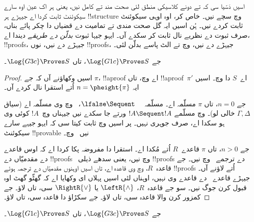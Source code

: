 \documentclass[../../../include/open-logic-section]{subfiles}
\begin{document}


اسیں دَسّیا سی کہ  تے  دونے کلاسیکی منطق لئی صحت مند تے کامل نیں، یعنی ہر اک عین اوہ سارے سیکوئنٹ ثابت کردا اے جیہڑے ہر !!{structure} وچ سچے نیں۔ خاص کر، اوہ اوہی سیکوئنٹ ثابت کردے نیں۔ ہُن اسیں ایہ گل صحت مندی تے تمامیت دے قضیاں دا چکر پائے بناں، صرف ثبوت دے نظریے نال ثابت کر سکدے آں۔ ایہو جیہا ثبوت \emph{بدلّن دے طریقے} دیندا اے، !!{proof}s، جیہڑے  دے نیں، نوں !!{proof}s، جیہڑے  دے نیں، وچ تے الٹ پاسے بدلّن لئی۔

\begin{prop}
جے $\Log{G1c} \Proves S$، تاں $\Log{G3c} \Proves S$۔
\end{prop}

\begin{proof}
  اسیں وکھاؤنے آں کہ جے $\pi$، !!a{proof} اے  وچ، تاں !!a{proof}~$\pi'$ اے~$S$ دا  وچ۔ اسیں ایہ $n
  = \pheight{\pi}$ اُتے استقرا نال کردے آں۔

  جے $n = 0$، تاں $\pi$ مسلّمہ اے۔ مسلّمہ $\lfalse \Sequent
  \quad$،~ وچ وی مسلّمہ اے (سیاق $ \Gamma,
  \Delta$ خالی لو)۔  وچ مسلّمے $!A \Sequent !A$ ورتے جا سکدے نیں جیہناں وچ~$!A$ کوئی وی ہو سکدا اے، صرف جوہری نہیں۔ پر اسیں  وچ ثابت کیتا سی کہ ایہو جیہے سارے سیکوئنٹ !!{provable} نیں~ وچ۔

  جے $n>0$، تاں $\pi$ قاعدے~$R$ اُتے مُکدا اے۔ استقرا دا مفروضہ پکا کردا اے کہ اوس قاعدے دے مقدمیّاں دے !!{proof}s~ وچ نیں، یعنی سدھے ذیلی !!{proof}s دے ترجمے~ وچ نیں۔ جے قاعدہ~$R$،  وچ وی قاعدہ اے، تاں اسیں اوہنوں مقدمیّاں دے ترجمہ ہوئے !!{proof}s اُتے لاؤنے آں۔ جیہڑے قاعدے~ دے قاعدے وی نہیں، اوہناں لئی اسیں پہلاں ای وکھایا اے کہ گھٹّو گھٹ اوہ قبول کرن جوگ نیں۔ سو جے قاعدہ~$R$، $\LeftR{\land}$ یا $\RightR{\lor}$ سی، تاں  لاؤ۔ جے کمزور کرن والا قاعدہ سی، تاں  لاؤ۔ جے سکڑاؤ دا قاعدہ سی، تاں  لاؤ۔
\end{proof}

\begin{prop}
جے $\Log{G3c} \Proves S$، تاں $\Log{G1c} \Proves S$۔
\end{prop}
\end{document}
